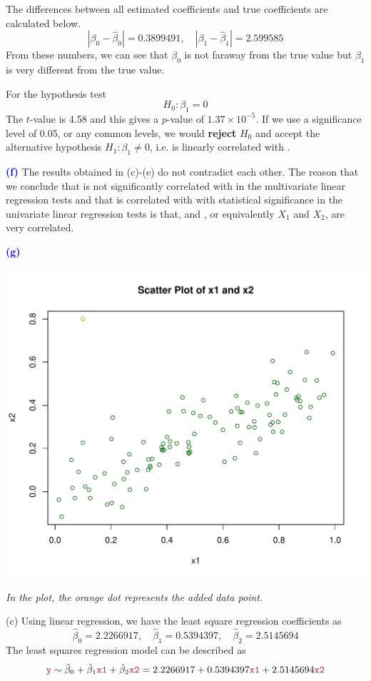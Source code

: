 \documentclass[a4paper,12pt]{article}
\newcommand{\qnum}[1]{\noindent\textcolor{blue}{\textbf{(#1)}}}
\begin{document}
The differences between all estimated coefficients and true coefficients are calculated below.
\[
    |\beta_0 - \hat\beta_0| = 0.3899491,\quad 
    |\beta_1 - \hat\beta_1| = 2.599585
\]
From these numbers, we can see that $\beta_0$ is not faraway from the true value but $\beta_1$ is very different from the true value.
\bigskip

For the hypothesis test
\[
    H_0: \beta_1 = 0
\]
The $t$-value is 4.58 and this gives a $p$-value of $1.37\times 10^{-5}$. If we use a significance level of 0.05, or any common levels, we would \textbf{reject} $H_0$ and accept the alternative hypothesis $H_1: \beta_1 \ne 0$, i.e. \yr is linearly correlated with \xbr.
\bigskip


\qnum{f}
The results obtained in (c)-(e) do not contradict each other. The reason that we conclude that \xbr is not significantly correlated with \yr in the multivariate linear regression tests and that \xbr is correlated with \yr with statistical significance in the univariate linear regression tests is that, \xar and \xbr, or equivalently $X_1$ and $X_2$, are very correlated.
\bigskip 



\qnum{g}

\begin{center}
    \includegraphics[width=0.7\linewidth]{Images/Prob2-Ex14-g-scatter.pdf}
    
    
    \parbox{0.65\textwidth}{\textit{In the plot, the \textcolor{myorange}{orange dot} represents the added data point.
    }}
\end{center}
\bigskip\bigskip

(c)
Using linear regression, we have the least square regression coefficients as 
\[
    \hat\beta_0 = 2.2266917,\quad 
    \hat\beta_1 = 0.5394397,\quad 
    \hat\beta_2 = 2.5145694
\]
The least squares regression model can be described as 
\[
    \yr \sim\hat\beta_0 + \hat\beta_1\xar + \hat\beta_2\xbr
    = 2.2266917 + 
    0.5394397\xar +
    2.5145694\xbr 
\]
\end{document}
